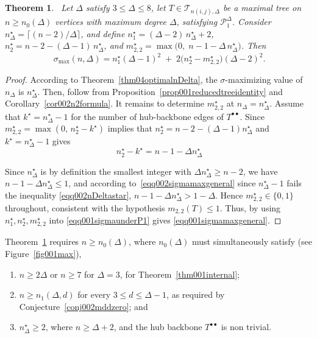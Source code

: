 \documentclass[12pt]{amsart}
\newtheorem{theorem}{Theorem}[section]
\newcommand{\TT}{\mathcal{T}}
\begin{document}
\begin{theorem}~\label{thm05generalclosedform}
Let $\Delta$ satisfy $3\leqslant\Delta\leqslant8$, let $T\in \TT_{n(i,j),\Delta}$ be a maximal tree
on $n\geqslant n_0(\Delta)$ vertices with maximum degree $\Delta$, satisfying
$\mathcal P_1^\Delta$. Consider $n_\Delta^\star=\lceil(n-2)/\Delta\rceil$, and define $n_1^\star= (\Delta-2)\,n_\Delta^\star + 2$, $n_2^\star =n - 2 - (\Delta-1)\,n_\Delta^\star$, and $m_{2,2}^\star  = \max\!\big(0,\; n-1-\Delta\, n_\Delta^\star\big)$. Then
\begin{equation}~\label{eqq001sigmamaxgeneral}
\sigma_{\max}(n,\Delta)\!=\!n_1^\star(\Delta-1)^2 \;+\; 2\big(n_2^\star-m_{2,2}^\star\big)(\Delta-2)^2.
\end{equation}
\end{theorem}
\begin{proof}
According to Theorem~\ref{thm04optimalnDelta}, the $\sigma$-maximizing value of $n_\Delta$ is $n_\Delta^\star$. Then, 
follow from Proposition~\ref{prop001reducedtreeidentity} and
Corollary~\ref{cor002n2formula}. It remains to determine $m_{2,2}^\star$ at $n_\Delta=n_\Delta^\star$. Assume that  $k^\star=n_\Delta^\star-1$ for the number
of hub-backbone edges of $T^{\bullet\bullet}$. Since
$m_{2,2}^\star=\max(0,\,n_2^\star-k^\star)$ implies that 
$n_2^\star=n-2-(\Delta-1)n_\Delta^\star$ and $k^\star=n_\Delta^\star-1$ gives
\begin{equation}~\label{eqq002sigmamaxgeneral}
n_2^\star-k^\star=n-1-\Delta n_\Delta^\star
\end{equation}

 Since $n_\Delta^\star$ is by definition the smallest integer with
$\Delta n_\Delta^\star \geqslant n-2$, we have $n-1-\Delta n_\Delta^\star \leqslant 1$,
and  according to~\eqref{eqq002sigmamaxgeneral} since $n_\Delta^\star-1$ fails the inequality
\eqref{eqq002nDeltastar}, $n-1-\Delta n_\Delta^\star > 1-\Delta$. Hence
$m_{2,2}^\star\in\{0,1\}$ throughout, consistent with the hypothesis
$m_{2,2}(T)\leqslant1$. Thus, by using $n_1^\star,n_2^\star,m_{2,2}^\star$ into
\eqref{eqq001sigmaunderP1} gives \eqref{eqq001sigmamaxgeneral}.
\end{proof}

Theorem~\ref{thm05generalclosedform} requires $n\geqslant n_0(\Delta)$, where
$n_0(\Delta)$ must simultaneously satisfy (see Figure~\ref{fig001max}), 
\begin{enumerate}
    \item $n\geqslant 2\Delta$ or $n\geqslant 7$ for
$\Delta=3$, for Theorem~\ref{thm001internal}; 
\item $n\geqslant n_1(\Delta,d)$ for every $3\leqslant d\leqslant\Delta-1$, as required by
Conjecture~\ref{conj002mddzero}; and 
\item  $n_\Delta^\star\geqslant 2$, where $n\ge\Delta+2$, and the hub backbone $T^{\bullet\bullet}$ is non trivial.
\end{enumerate}
\end{document}
